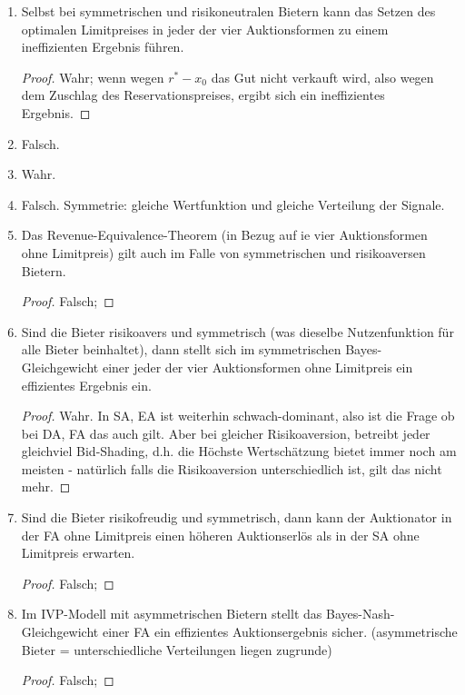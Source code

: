 \documentclass[12pt]{extreport} %
\theoremstyle{named}
\theoremstyle{nnamed}
\theoremstyle{itshape}
\theoremstyle{normal}
\begin{document}
\begin{enumerate}
		\begin{proof}
			Falsch, wir betrachten nur den Erwarteten Erlös, der tatsächliche realisierte Preis kann in einzelnen Beobachtungen niedriger sein.
		\end{proof}
	\item Selbst bei symmetrischen und risikoneutralen Bietern kann das Setzen des optimalen Limitpreises in jeder der vier Auktionsformen zu einem ineffizienten Ergebnis führen.
		\begin{proof}
			Wahr; wenn wegen $r^{*} - x_{0}$ das Gut nicht verkauft wird, also wegen dem Zuschlag des Reservationspreises, ergibt sich ein ineffizientes Ergebnis.
		\end{proof}
	\item Falsch.
	\item Wahr.
	\item Falsch. Symmetrie: gleiche Wertfunktion und gleiche Verteilung der Signale.
	\item Das Revenue-Equivalence-Theorem (in Bezug auf ie vier Auktionsformen ohne Limitpreis) gilt auch im Falle von symmetrischen und risikoaversen Bietern.
		\begin{proof}
			Falsch;
		\end{proof}
	\item Sind die Bieter risikoavers und symmetrisch (was dieselbe Nutzenfunktion für alle Bieter beinhaltet), dann stellt sich im symmetrischen Bayes-Gleichgewicht einer jeder der vier Auktionsformen ohne Limitpreis ein effizientes Ergebnis ein.
		\begin{proof}
			 Wahr. In SA, EA ist weiterhin schwach-dominant, also ist die Frage ob bei DA, FA das auch gilt. Aber bei gleicher Risikoaversion, betreibt jeder gleichviel Bid-Shading, d.h. die Höchste Wertschätzung bietet immer noch am meisten - natürlich falls die Risikoaversion unterschiedlich ist, gilt das nicht mehr.
		\end{proof}
	\item Sind die Bieter risikofreudig und symmetrisch, dann kann der Auktionator in der FA ohne Limitpreis einen höheren Auktionserlös als in der SA ohne Limitpreis erwarten.
		\begin{proof}
			Falsch; 
		\end{proof}
	\item Im IVP-Modell mit asymmetrischen Bietern stellt das Bayes-Nash-Gleichgewicht einer FA ein effizientes Auktionsergebnis sicher. (asymmetrische Bieter = unterschiedliche Verteilungen liegen zugrunde)
		\begin{proof}
			Falsch;
		\end{proof}
\end{enumerate}
\end{document}
